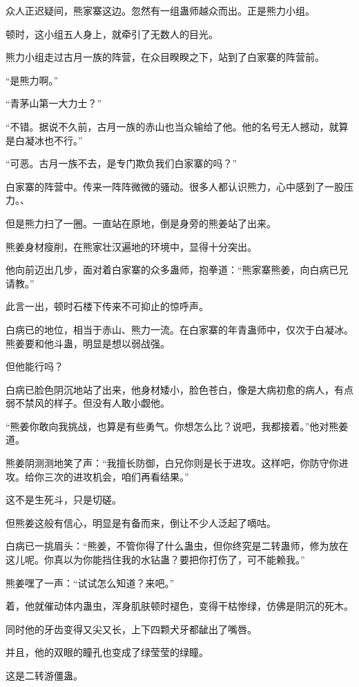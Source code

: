 \begin{this_body}
众人正迟疑间，熊家寨这边。忽然有一组蛊师越众而出。正是熊力小组。

顿时，这小组五人身上，就牵引了无数人的目光。

熊力小组走过古月一族的阵营，在众目睽睽之下，站到了白家寨的阵营前。

“是熊力啊。”

“青茅山第一大力士？”

“不错。据说不久前，古月一族的赤山也当众输给了他。他的名号无人撼动，就算是白凝冰也不行。”

“可恶。古月一族不去，是专门欺负我们白家寨的吗？”

白家寨的阵营中。传来一阵阵微微的骚动。很多人都认识熊力，心中感到了一股压力。、

但是熊力扫了一圈。一直站在原地，倒是身旁的熊姜站了出来。

熊姜身材瘦削，在熊家壮汉遍地的环境中，显得十分突出。

他向前迈出几步，面对着白家寨的众多蛊师，抱拳道：“熊家寨熊姜，向白病已兄请教。”

此言一出，顿时石楼下传来不可抑止的惊呼声。

白病已的地位，相当于赤山、熊力一流。在白家寨的年青蛊师中，仅次于白凝冰。熊姜要和他斗蛊，明显是想以弱战强。

但他能行吗？

白病已脸色阴沉地站了出来，他身材矮小，脸色苍白，像是大病初愈的病人，有点弱不禁风的样子。但没有人敢小觑他。

“熊姜你敢向我挑战，也算是有些勇气。你想怎么比？说吧，我都接着。”他对熊姜道。

熊姜阴测测地笑了声：“我擅长防御，白兄你则是长于进攻。这样吧，你防守你进攻。给你三次的进攻机会，咱们再看结果。”

这不是生死斗，只是切磋。

但熊姜这般有信心，明显是有备而来，倒让不少人泛起了嘀咕。

白病已一挑眉头：“熊姜，不管你得了什么蛊虫，但你终究是二转蛊师，修为放在这儿呢。你真以为你能挡住我的水钻蛊？要把你打伤了，可不能赖我。”

熊姜嘿了一声：“试试怎么知道？来吧。”

着，他就催动体内蛊虫，浑身肌肤顿时褪色，变得干枯惨绿，仿佛是阴沉的死木。

同时他的牙齿变得又尖又长，上下四颗犬牙都龇出了嘴唇。

并且，他的双眼的瞳孔也变成了绿莹莹的绿瞳。

这是二转游僵蛊。


\end{this_body}
